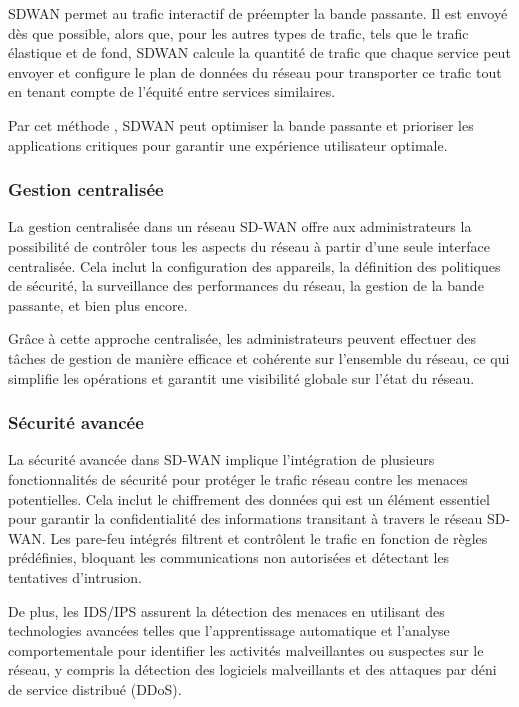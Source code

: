 SDWAN permet au trafic interactif de préempter la bande passante. Il est envoyé dès que possible, alors que, pour les autres types de trafic, tels que le trafic élastique et de fond, SDWAN calcule la quantité de trafic que chaque service peut envoyer et configure le plan de données du réseau pour transporter ce trafic tout en tenant compte de l'équité entre services similaires. 

Par cet méthode , SDWAN peut optimiser la bande passante et  prioriser les applications critiques pour garantir une expérience utilisateur optimale.

\subsubsection{Gestion centralisée  }

La gestion centralisée dans un réseau SD-WAN offre aux administrateurs la possibilité de contrôler tous les aspects du réseau à partir d'une seule interface centralisée. Cela inclut la configuration des appareils, la définition des politiques de sécurité, la surveillance des performances du réseau, la gestion de la bande passante, et bien plus encore. 

Grâce à cette approche centralisée, les administrateurs peuvent effectuer des tâches de gestion de manière efficace et cohérente sur l'ensemble du réseau, ce qui simplifie les opérations et garantit une visibilité globale sur l'état du réseau.
\subsubsection{Sécurité avancée   }

La sécurité avancée dans SD-WAN implique l'intégration de plusieurs fonctionnalités de sécurité pour protéger le trafic réseau contre les menaces potentielles. Cela inclut le chiffrement des données qui est un élément  essentiel pour garantir la confidentialité des informations transitant à travers le réseau SD-WAN. Les pare-feu intégrés filtrent et contrôlent le trafic en fonction de règles prédéfinies, bloquant les communications non autorisées et détectant les tentatives d'intrusion.

 De plus, les IDS/IPS assurent la détection des menaces en utilisant des technologies avancées telles que l'apprentissage automatique et l'analyse comportementale pour identifier les activités malveillantes ou suspectes sur le réseau, y compris la détection des logiciels malveillants et des attaques par déni de service distribué (DDoS).
 
